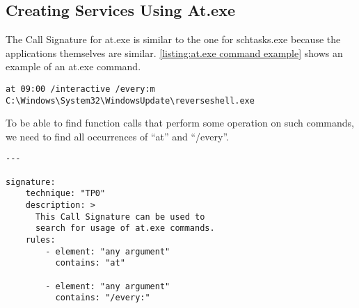 \subsection{Creating Services Using At.exe}
The Call Signature for at.exe is similar to the one for schtasks.exe because the applications themselves are similar. \autoref{listing:at.exe command example} shows an example of an at.exe command.

\begin{lstlisting}[label={listing:at.exe command example}, caption={An example \texttt{at.exe} command that runs a fictitious executable every Monday at 9:00.}, captionpos=b]
at 09:00 /interactive /every:m C:\Windows\System32\WindowsUpdate\reverseshell.exe
\end{lstlisting}

To be able to find function calls that perform some operation on such commands, we need to find all occurrences of ``at'' and ``/every''.

\begin{minipage}{0.9\textwidth}
\begin{lstlisting}[label={listing:call signature at.exe}, caption={A Call Signature that matches creating a scheduled task using the \texttt{at.exe} application.}, captionpos=b]
---

signature:
    technique: "TP0"
    description: >
      This Call Signature can be used to
      search for usage of at.exe commands.
    rules:
        - element: "any argument"
          contains: "at"

        - element: "any argument"
          contains: "/every:"
\end{lstlisting}
\end{minipage}
